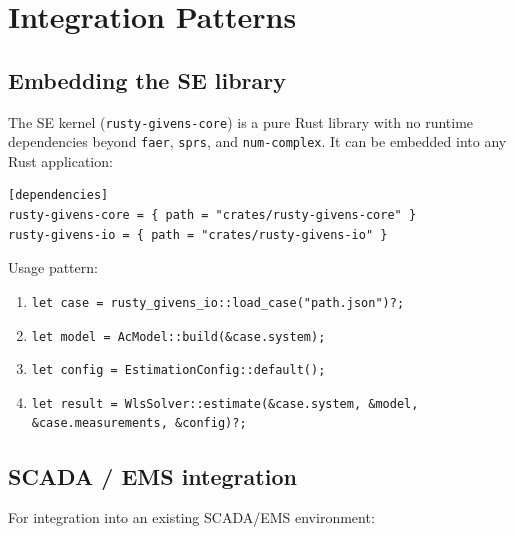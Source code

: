 \documentclass[11pt,a4paper]{article}
\begin{document}

\section{Integration Patterns}\label{sec:integration}

\subsection{Embedding the SE library}

The SE kernel (\texttt{rusty-givens-core}) is a pure Rust library with no
runtime dependencies beyond \texttt{faer}, \texttt{sprs}, and
\texttt{num-complex}.  It can be embedded into any Rust application:

\begin{lstlisting}[language={},caption={Cargo.toml dependency}]
[dependencies]
rusty-givens-core = { path = "crates/rusty-givens-core" }
rusty-givens-io = { path = "crates/rusty-givens-io" }
\end{lstlisting}

\noindent
Usage pattern:
\begin{enumerate}
  \item \texttt{let case = rusty\_givens\_io::load\_case("path.json")?;}
  \item \texttt{let model = AcModel::build(\&case.system);}
  \item \texttt{let config = EstimationConfig::default();}
  \item \texttt{let result = WlsSolver::estimate(\&case.system, \&model,}
        \texttt{\&case.measurements, \&config)?;}
\end{enumerate}

\subsection{SCADA / EMS integration}

For integration into an existing SCADA/EMS environment:
\end{document}
